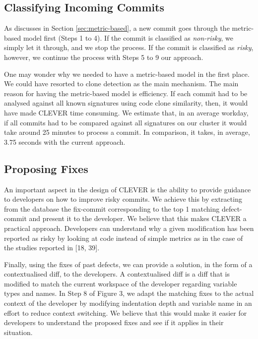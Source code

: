 \documentclass[sigconf]{acmart}
\begin{document}
\subsection{Classifying Incoming
Commits}\label{classifying-incoming-commits}

As discusses in Section \ref{sec:metric-based}, a new commit goes
through the metric-based model first (Steps 1 to 4). If the commit is
classified as \emph{non-risky}, we simply let it through, and we stop
the process. If the commit is classified as \emph{risky}, however, we
continue the process with Steps 5 to 9 our approach.

One may wonder why we needed to have a metric-based model in the first
place. We could have resorted to clone detection as the main mechanism.
The main reason for having the metric-based model is efficiency. If each
commit had to be analysed against all known signatures using code clone
similarity, then, it would have made CLEVER time consuming. We estimate
that, in an average workday, if all commits had to be compared against
all signatures on our cluster it would take around 25 minutes to process
a commit. In comparison, it takes, in average, 3.75 seconds with the
current approach.

\subsection{Proposing Fixes}\label{proposing-fixes}

An important aspect in the design of CLEVER is the ability to provide
guidance to developers on how to improve risky commits. We achieve this
by extracting from the database the fix-commit corresponding to the top
1 matching defect-commit and present it to the developer. We believe
that this makes CLEVER a practical approach. Developers can understand
why a given modification has been reported as risky by looking at code
instead of simple metrics as in the case of the studies reported in
{[}18, 39{]}.

Finally, using the fixes of past defects, we can provide a solution, in
the form of a contextualised diff, to the developers. A contextualised
diff is a diff that is modified to match the current workspace of the
developer regarding variable types and names. In Step 8 of Figure 3, we
adapt the matching fixes to the actual context of the developer by
modifying indentation depth and variable name in an effort to reduce
context switching. We believe that this would make it easier for
developers to understand the proposed fixes and see if it applies in
their situation.
\end{document}
